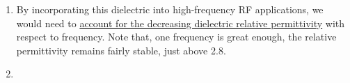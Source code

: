 \begin{enumerate}
\begin{enumerate}
      \item By incorporating this dielectric into high-frequency RF applications, we would need to \underline{account for the decreasing dielectric relative permittivity} with respect to frequency. Note that, one frequency is great enough, the relative permittivity remains fairly stable, just above 2.8.

      \item 

    \end{enumerate}

\end{enumerate}



